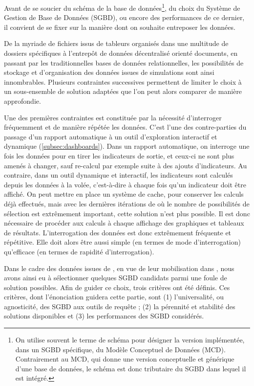 Avant de se soucier du \og schéma\fg{} de la base de données\footnote{
	On utilise souvent le terme de \og schéma\fg{} pour désigner la version implémentée, dans un SGBD spécifique, du Modèle Conceptuel de Données (MCD).
	Contrairement au MCD, qui donne une version conceptuelle et générique d'une base de données, le schéma est donc tributaire du SGBD dans lequel il est intégré.
}, du choix du Système de Gestion de Base de Données (SGBD), ou encore des performances de ce dernier, il convient de se fixer sur la manière dont on souhaite entreposer les données.

De la myriade de fichiers issus de tableurs organisés dans une multitude de dossiers spécifiques à l'entrepôt de données décentralisé orienté documents, en passant par les traditionnelles bases de données relationnelles, les possibilités de stockage et d'organisation des données issues de simulations sont ainsi innombrables.
Plusieurs contraintes successives permettent de limiter le choix à un sous-ensemble de solution adaptées que l'on peut alors comparer de manière approfondie.

Une des premières contraintes est constituée par la nécessité d'interroger fréquemment et de manière répétée les données.
C'est l'une des contre-parties du passage d'un rapport automatique à un outil d'exploration interactif et dynamique (\cref{subsec:dashboards}).
Dans un rapport automatique, on interroge une fois les données pour en tirer les indicateurs de sortie, et ceux-ci ne sont plus amenés à changer, sauf re-calcul par exemple suite à des ajouts d'indicateurs.
Au contraire, dans un outil dynamique et interactif, les indicateurs sont calculés depuis les données \og à la volée\fg{}, c'est-à-dire à chaque fois qu'un indicateur doit être affiché.
On peut mettre en place un système de cache, pour conserver les calculs déjà effectués, mais avec les dernières itérations de \simedb{} où le nombre de possibilités de sélection est extrêmement important, cette solution n'est plus possible.
Il est donc nécessaire de procéder aux calculs à chaque affichage des graphiques et tableaux de résultats.
L'interrogation des données est donc extrêmement fréquente et répétitive.
Elle doit alors être aussi simple (en termes de mode d'interrogation) qu'efficace (en termes de rapidité d'interrogation).

Dans le cadre des données issues de \simfeodal{}, en vue de leur mobilisation dans \simedb{}, nous avons ainsi eu à sélectionner quelques SGBD candidats parmi une foule de solution possibles.
Afin de guider ce choix, trois critères ont été définis.
Ces critères, dont l'énonciation guidera cette partie, sont (1) l'universalité, ou \og agnosticité\fg{}, des SGBD aux outils de requête ; (2) la pérennité et stabilité des solutions disponibles et (3) les performances des SGBD considérés.

